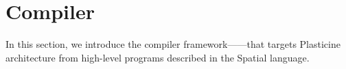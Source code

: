 \chapter{Compiler} \label{sec:compiler}

In this section, we introduce the compiler framework---\name---that targets Plasticine
architecture from high-level programs described in the Spatial language. 

